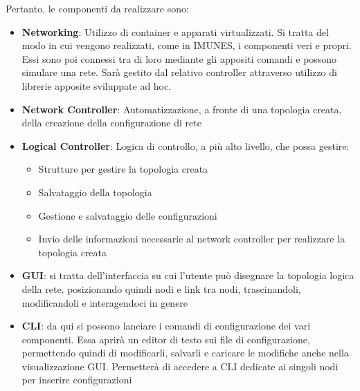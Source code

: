 Pertanto, le componenti da realizzare sono:
\begin{itemize}
    \item \textbf{Networking}: Utilizzo di container e apparati virtualizzati. Si tratta del modo in cui vengono realizzati, come in IMUNES, i componenti veri e propri. Essi sono poi connessi tra di loro mediante gli appositi comandi e possono simulare una rete. Sarà gestito dal relativo controller attraverso utilizzo di librerie apposite sviluppate ad hoc.
    \item \textbf{Network Controller}: Automatizzazione, a fronte di una topologia creata, della creazione della configurazione di rete
    \item \textbf{Logical Controller}: Logica di controllo, a più alto livello, che possa gestire:
          \begin{itemize}
              \item Strutture per gestire la topologia creata
              \item Salvataggio della topologia
              \item Gestione e salvataggio delle configurazioni
              \item Invio delle informazioni necessarie al network controller per realizzare la topologia creata
          \end{itemize}
    \item \textbf{GUI}: si tratta dell'interfaccia su cui l'utente può disegnare la topologia logica della rete, posizionando quindi nodi e link tra nodi, trascinandoli, modificandoli e interagendoci in genere
    \item \textbf{CLI}: da qui si possono lanciare i comandi di configurazione dei vari componenti. Essa aprirà un editor di testo sui file di configurazione, permettendo quindi di modificarli, salvarli e caricare le modifiche anche nella visualizzazione GUI. Permetterà di accedere a CLI dedicate ai singoli nodi per inserire configurazioni
\end{itemize}


\newpage
